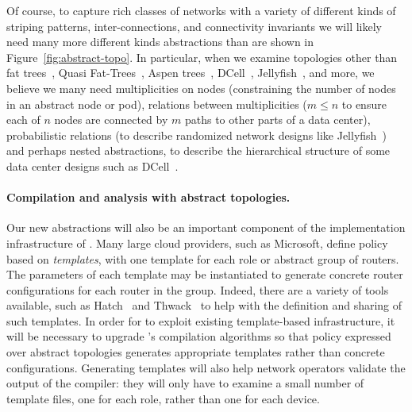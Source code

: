 Of course, to capture rich classes of networks with a variety of
different kinds of striping patterns, inter-connections, and connectivity
invariants
we will likely need many more different kinds abstractions than are
shown in Figure~\ref{fig:abstract-topo}.  In particular, when we examine 
topologies other than fat trees~\cite{al-fares:data-center-architecture,f10},
Quasi Fat-Trees~\cite{quasi-fat-trees}, Aspen trees~\cite{aspen-trees}, DCell~\cite{dcell}, Jellyfish~\cite{jellyfish}, and more,
we believe we many need multiplicities on nodes (constraining the
number of nodes in an abstract node or pod), relations between 
multiplicities ($m \leq n$
to ensure each of $n$ nodes are connected by $m$ paths to other parts of
a data center), probabilistic relations (to describe randomized network
designs like Jellyfish~\cite{jellyfish}) and perhaps nested abstractions, to describe the
hierarchical structure of some data center designs such as DCell~\cite{dcell}.  

\paragraph*{Compilation and analysis with abstract topologies.}
Our new abstractions will also be an important component of the implementation
infrastructure of \Name. 
Many large cloud providers, such as Microsoft, define policy based on
\emph{templates}, with one template for each role or abstract group of
routers.  The parameters of each template may be instantiated to generate
concrete router configurations for each router in the group.
Indeed, there are a variety of tools available, such as Hatch~\cite{hatch}
and Thwack~\cite{thwack} 
to help with the definition and sharing of such templates.
In order for \Name to exploit existing template-based infrastructure,
it will be necessary to upgrade \Name's compilation algorithms so
that policy expressed over abstract topologies generates appropriate
templates rather than concrete configurations.  Generating templates will
also help network operators validate the output of the \Name compiler:
they will only have to examine a small number of template files, one for
each role, rather than one for each device.

